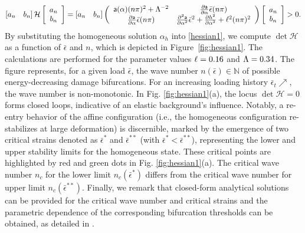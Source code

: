 \documentclass[10pt]{article}
\begin{document}
\begin{align}\left[ a_n \quad b_n \right] \mathcal{H} \left[ \begin{array}{c} a_n \\ b_n \end{array} \right]=\left[ a_n \quad b_n \right]\left(
\begin{array}{cc}
\mathsf{a}(\alpha)(n\pi)^2+\Lambda^{-2}  & \frac{\partial \mathsf{a}}{\partial \alpha}\bar\epsilon(n\pi)  \\
\frac{\partial \mathsf{a}}{\partial \alpha}\bar\epsilon(n\pi)  &   \frac{\partial^2 \mathsf{a}}{\partial \alpha^2}\bar\epsilon^2+ \frac{\partial h^2}{\partial \alpha^2}+\ell^2(n\pi)^2  \\
\end{array}
\right)\left[ \begin{array}{c} a_n \\ b_n \end{array} \right]>0.\label{hessian1}\end{align}
%
By substituting the homogeneous solution $\alpha_h$ into \eqref{hessian1}, we compute $\det \mathcal{H}$ as a function of $\bar \epsilon$ and $n$, which is depicted in Figure~\ref{fig:hessian1}. The calculations are performed for the parameter values $\ell=0.16$ and $\Lambda=0.34$.
The figure represents, for a given load $\bar \epsilon$, the wave number $n(\bar \epsilon)\in \mathbb N$ of possible energy-decreasing damage bifurcations. For an increasing loading history $\bar \epsilon_t\nearrow$, the wave number is non-monotonic.
In Fig. \ref{fig:hessian1}(a), the locus $\det \mathcal H=0$ forms closed loops, indicative of an elastic background's influence. Notably, a re-entry behavior of the affine configuration  (i.e., the homogeneous configuration re-stabilizes at large deformation) is discernible, marked by the emergence of two critical strains denoted as $\bar\epsilon^*$ and $\bar\epsilon^{**}$ (with $\bar\epsilon^* < \bar\epsilon^{**}$), representing the lower and upper stability limits for the homogeneous state. These critical points are highlighted by red and green dots in Fig. \ref{fig:hessian1}(a). The critical wave number $n_c$ for the lower limit $n_c(\bar{\epsilon}^*)$    differs from the critical wave number for  upper limit $n_c(\bar{\epsilon}^{**})$. Finally, we remark that closed-form analytical solutions can be provided for the critical wave number and critical strains and the parametric dependence of the corresponding bifurcation thresholds can be obtained, as detailed in \cite{Salman2021-mn}.
\end{document}
